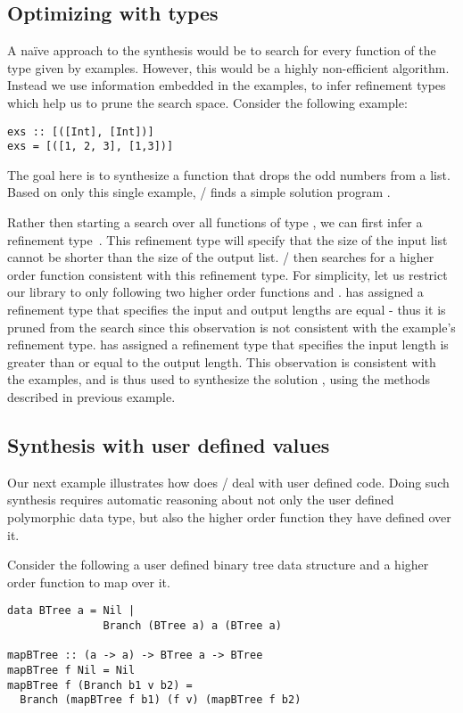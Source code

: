\subsection{Optimizing with types}
\label{sec:exampleFilter}

A na\"ive approach to the synthesis would be to search 
for every function of the type given by examples. However, this would be
a highly non-efficient algorithm.
Instead we use information embedded in the examples, to infer refinement types which help us to prune the search space.
Consider the following example:
\begin{lstlisting}
exs :: [([Int], [Int])]
exs = [([1, 2, 3], [1,3])]
\end{lstlisting}
The goal here is to synthesize a function that drops the odd numbers from a list. Based on only this single example, \ourTool/ finds a simple solution program .

Rather then starting a search over all functions of type \codeinline{[Int] -> [Int]}, we can first infer a refinement 
type~\cite{DBLP:conf/icfp/VazouSJVJ14}.
This refinement type will specify that the size of the input list cannot
be shorter than the size of the output list.
\ourTool/ then searches for a higher order function consistent with this refinement type.
For simplicity, let us restrict our library to only following two
higher order functions  and .
 has assigned a refinement type that specifies the input and output lengths are equal - thus it is pruned from the search since this observation is not consistent with the example's refinement type.
 has assigned a refinement type that specifies the input length is greater than or equal to the output length.
This observation is consistent with the examples, and is thus used to synthesize the solution , using the methods described in previous example.


\subsection{Synthesis with user defined values}
\label{sec:exampleBTree}

Our next example illustrates how does  \ourTool/ deal with user defined code. Doing such synthesis requires automatic reasoning about not only the user defined polymorphic data type, but also the higher order function they have defined over it.

Consider the following a user defined binary tree data structure and a higher order function to map over it.
\begin{lstlisting}
data BTree a = Nil |
               Branch (BTree a) a (BTree a)

mapBTree :: (a -> a) -> BTree a -> BTree 
mapBTree f Nil = Nil
mapBTree f (Branch b1 v b2) = 
  Branch (mapBTree f b1) (f v) (mapBTree f b2)
\end{lstlisting}

